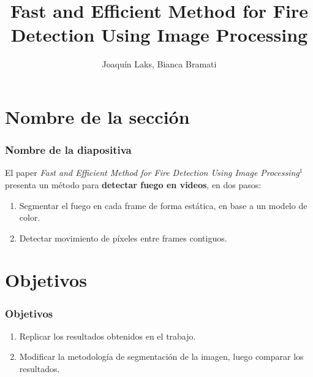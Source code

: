 \documentclass{beamer}
\title[Procesamiento de Imágenes] 
{Fast and Efficient Method for
Fire Detection Using Image Processing}
\author[Joaquín Laks, Bianca Bramati] 
{Joaquín Laks, Bianca Bramati}
\institute[] 
{
  Procesamiento de Imágenes\\
  2° Cuatrimestre 2024 \\
}
\date{}
\begin{document}
\frame{\titlepage}
\section{Nombre de la sección}
\begin{frame}
\frametitle{Nombre de la diapositiva}
El paper \textit{Fast and Efficient Method for Fire Detection Using Image Processing}$^1$ presenta un método para \textbf{detectar fuego en videos}, en dos pasos:
\begin{enumerate}
    \item Segmentar el fuego en cada frame de forma estática, en base a un modelo de color.
    \item Detectar movimiento de píxeles entre frames contiguos. 
\end{enumerate} 
\end{frame}

\section{Objetivos}
\begin{frame}
\frametitle{Objetivos}
\begin{enumerate}
    \item Replicar los resultados obtenidos en el trabajo.
    \item Modificar la metodología de segmentación de la imagen, luego comparar los resultados.
\end{enumerate}
\end{frame}
\end{document}
